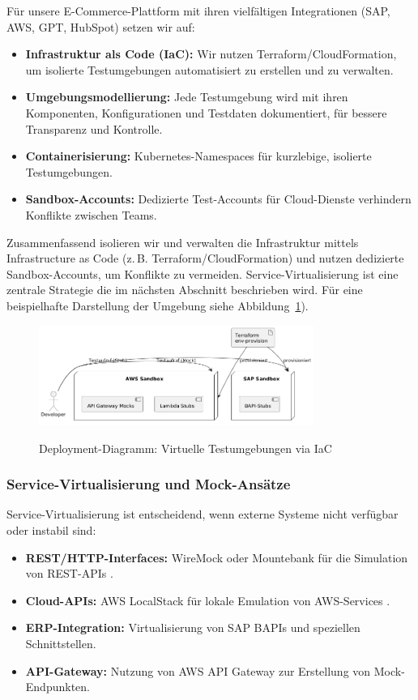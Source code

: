 Für unsere E-Commerce-Plattform mit ihren vielfältigen Integrationen (SAP, AWS, GPT, HubSpot) setzen wir auf:
\begin{itemize}
    \item \textbf{Infrastruktur als Code (IaC):} Wir nutzen Terraform/CloudFormation, um isolierte
    Testumgebungen automatisiert zu erstellen und zu verwalten.
    \item \textbf{Umgebungsmodellierung:} Jede Testumgebung wird mit ihren Komponenten,
    Konfigurationen und Testdaten dokumentiert, für bessere Transparenz und Kontrolle.
    \item \textbf{Containerisierung:} Kubernetes-Namespaces für kurzlebige, isolierte Testumgebungen.
    \item \textbf{Sandbox-Accounts:} Dedizierte Test-Accounts für Cloud-Dienste verhindern
    Konflikte zwischen Teams.
\end{itemize}

Zusammenfassend isolieren wir und verwalten die Infrastruktur mittels Infrastructure as Code
(z.\,B. Terraform/CloudFormation) und nutzen dedizierte Sandbox-Accounts, um Konflikte zu vermeiden.
Service-Virtualisierung ist eine zentrale Strategie die im nächsten Abschnitt beschrieben wird.
Für eine beispielhafte Darstellung der Umgebung siehe Abbildung~\ref{fig:deployment}).

\begin{figure}[h!]
\centering
\caption{Deployment-Diagramm: Virtuelle Testumgebungen via IaC}
    \includegraphics[width=0.8\textwidth]{fig/stubing.png}
    \label{fig:deployment}
\end{figure}

\subsubsection{Service-Virtualisierung und Mock-Ansätze}
Service-Virtualisierung ist entscheidend, wenn externe Systeme nicht verfügbar oder instabil sind:

\begin{itemize}
    \item \textbf{REST/HTTP-Interfaces:} WireMock oder Mountebank für die Simulation von REST-APIs
    \cite{wiremock2025}.
    \item \textbf{Cloud-APIs:} AWS LocalStack für lokale Emulation von AWS-Services \cite{aws2021}.
    \item \textbf{ERP-Integration:} Virtualisierung von SAP BAPIs und speziellen Schnittstellen.
    \item \textbf{API-Gateway:} Nutzung von AWS API Gateway zur Erstellung von Mock-Endpunkten.
\end{itemize}

